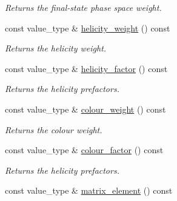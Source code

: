 \begin{DoxyCompactItemize}
\begin{DoxyCompactList}\small\item\em Returns the final-\/state phase space weight. \end{DoxyCompactList}\item 
\hypertarget{a00430_aca631af91752a7bdd6ead030c0b01c18}{const value\-\_\-type \& \hyperlink{a00430_aca631af91752a7bdd6ead030c0b01c18}{helicity\-\_\-weight} () const }\label{a00430_aca631af91752a7bdd6ead030c0b01c18}

\begin{DoxyCompactList}\small\item\em Returns the helicity weight. \end{DoxyCompactList}\item 
\hypertarget{a00430_a37f4d692d648bf3a752363d99693a070}{const value\-\_\-type \& \hyperlink{a00430_a37f4d692d648bf3a752363d99693a070}{helicity\-\_\-factor} () const }\label{a00430_a37f4d692d648bf3a752363d99693a070}

\begin{DoxyCompactList}\small\item\em Returns the helicity prefactors. \end{DoxyCompactList}\item 
\hypertarget{a00430_a183f62b32bdf1a26893679cf5a6e08e5}{const value\-\_\-type \& \hyperlink{a00430_a183f62b32bdf1a26893679cf5a6e08e5}{colour\-\_\-weight} () const }\label{a00430_a183f62b32bdf1a26893679cf5a6e08e5}

\begin{DoxyCompactList}\small\item\em Returns the colour weight. \end{DoxyCompactList}\item 
\hypertarget{a00430_a2ea429e4ea0150b714ce3400cdd0ef7c}{const value\-\_\-type \& \hyperlink{a00430_a2ea429e4ea0150b714ce3400cdd0ef7c}{colour\-\_\-factor} () const }\label{a00430_a2ea429e4ea0150b714ce3400cdd0ef7c}

\begin{DoxyCompactList}\small\item\em Returns the helicity prefactors. \end{DoxyCompactList}\item 
\hypertarget{a00430_a65efe3877d8bd7d3063595edbeb377d0}{const value\-\_\-type \& \hyperlink{a00430_a65efe3877d8bd7d3063595edbeb377d0}{matrix\-\_\-element} () const }\label{a00430_a65efe3877d8bd7d3063595edbeb377d0}


\end{DoxyCompactItemize}
